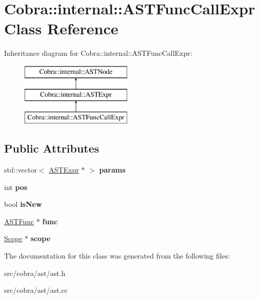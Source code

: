 \hypertarget{class_cobra_1_1internal_1_1_a_s_t_func_call_expr}{\section{Cobra\+:\+:internal\+:\+:A\+S\+T\+Func\+Call\+Expr Class Reference}
\label{class_cobra_1_1internal_1_1_a_s_t_func_call_expr}
}
Inheritance diagram for Cobra\+:\+:internal\+:\+:A\+S\+T\+Func\+Call\+Expr\+:\begin{figure}[H]
\begin{center}
\leavevmode
\includegraphics[height=3.000000cm]{class_cobra_1_1internal_1_1_a_s_t_func_call_expr}
\end{center}
\end{figure}
\subsection*{Public Attributes}
\begin{DoxyCompactItemize}
\item 
\hypertarget{class_cobra_1_1internal_1_1_a_s_t_func_call_expr_aa753794f6a51fe645d6168aa4f83c594}{std\+::vector$<$ \hyperlink{class_cobra_1_1internal_1_1_a_s_t_expr}{A\+S\+T\+Expr} $\ast$ $>$ {\bfseries params}}\label{class_cobra_1_1internal_1_1_a_s_t_func_call_expr_aa753794f6a51fe645d6168aa4f83c594}

\item 
\hypertarget{class_cobra_1_1internal_1_1_a_s_t_func_call_expr_ac2d3cd56d13cd40bae1eb030183e2d1f}{int {\bfseries pos}}\label{class_cobra_1_1internal_1_1_a_s_t_func_call_expr_ac2d3cd56d13cd40bae1eb030183e2d1f}

\item 
\hypertarget{class_cobra_1_1internal_1_1_a_s_t_func_call_expr_a5842d495d42a61e1504dec7ca8a8e4a5}{bool {\bfseries is\+New}}\label{class_cobra_1_1internal_1_1_a_s_t_func_call_expr_a5842d495d42a61e1504dec7ca8a8e4a5}

\item 
\hypertarget{class_cobra_1_1internal_1_1_a_s_t_func_call_expr_a2cbcc879dc96092f1a8a627d85524b69}{\hyperlink{class_cobra_1_1internal_1_1_a_s_t_func}{A\+S\+T\+Func} $\ast$ {\bfseries func}}\label{class_cobra_1_1internal_1_1_a_s_t_func_call_expr_a2cbcc879dc96092f1a8a627d85524b69}

\item 
\hypertarget{class_cobra_1_1internal_1_1_a_s_t_func_call_expr_a28afbf7c743500c44ca999c95f1f2346}{\hyperlink{class_cobra_1_1internal_1_1_scope}{Scope} $\ast$ {\bfseries scope}}\label{class_cobra_1_1internal_1_1_a_s_t_func_call_expr_a28afbf7c743500c44ca999c95f1f2346}

\end{DoxyCompactItemize}


The documentation for this class was generated from the following files\+:\begin{DoxyCompactItemize}
\item 
src/cobra/ast/ast.\+h\item 
src/cobra/ast/ast.\+cc\end{DoxyCompactItemize}
